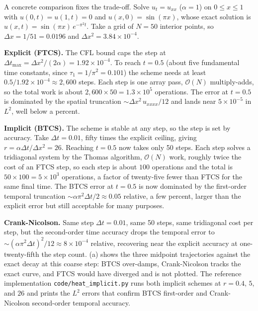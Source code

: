 A concrete comparison fixes the trade-off. Solve $u_{t} = u_{xx}$
($\alpha = 1$) on $0 \leq x \leq 1$ with $u(0,t) = u(1,t) = 0$ and
$u(x,0) = \sin(\pi x)$, whose exact solution is $u(x,t) =
\sin(\pi x)\, e^{-\pi^{2} t}$. Take a grid of $N = 50$ interior
points, so $\Delta x = 1/51 = 0.0196$ and $\Delta x^{2} = 3.84
\times 10^{-4}$.

\textbf{Explicit (FTCS).} The CFL bound caps the step at $\Delta
t_{\max} = \Delta x^{2}/(2\alpha) = 1.92 \times 10^{-4}$. To reach
$t = 0.5$ (about five fundamental time constants, since $\tau_{1} =
1/\pi^{2} = 0.101$) the scheme needs at least $0.5/1.92 \times
10^{-4} \approx 2{,}600$ steps. Each step is one array pass,
$\mathcal{O}(N)$ multiply-adds, so the total work is about $2{,}600
\times 50 = 1.3 \times 10^{5}$ operations. The error at $t = 0.5$
is dominated by the spatial truncation $\sim \Delta x^{2}\,u_{xxxx}/
12$ and lands near $5 \times 10^{-5}$ in $L^{2}$, well below a
percent.

\textbf{Implicit (BTCS).} The scheme is stable at any step, so the
step is set by accuracy. Take $\Delta t = 0.01$, fifty times the
explicit ceiling, giving $r = \alpha\Delta t/\Delta x^{2} = 26$.
Reaching $t = 0.5$ now takes only 50 steps. Each step solves a
tridiagonal system by the Thomas algorithm, $\mathcal{O}(N)$ work,
roughly twice the cost of an FTCS step, so each step is about $100$
operations and the total is $50 \times 100 = 5 \times 10^{3}$
operations, a factor of twenty-five fewer than FTCS for the same
final time. The BTCS error at $t = 0.5$ is now dominated by the
first-order temporal truncation $\sim \alpha\pi^{2}\Delta t/2
\approx 0.05$ relative, a few percent, larger than the explicit
error but still acceptable for many purposes.

\textbf{Crank-Nicolson.} Same step $\Delta t = 0.01$, same 50
steps, same tridiagonal cost per step, but the second-order time
accuracy drops the temporal error to $\sim (\alpha\pi^{2}\Delta
t)^{2}/12 \approx 8 \times 10^{-4}$ relative, recovering near the
explicit accuracy at one-twenty-fifth the step count.
(a) shows the three
midpoint trajectories against the exact decay at this coarse step:
BTCS over-damps, Crank-Nicolson tracks the exact curve, and FTCS
would have diverged and is not plotted. The reference
implementation \texttt{code/heat\_implicit.py} runs both implicit
schemes at $r = 0.4$, $5$, and $26$ and prints the $L^{2}$ errors
that confirm BTCS first-order and Crank-Nicolson second-order
temporal accuracy.

